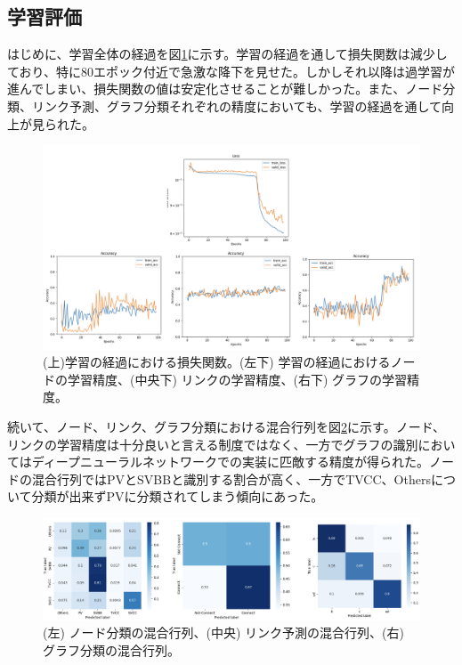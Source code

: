\subsection{学習評価}
はじめに、学習全体の経過を図\ref{gnnoutput}に示す。学習の経過を通して損失関数は減少しており、特に80エポック付近で急激な降下を見せた。しかしそれ以降は過学習が進んでしまい、損失関数の値は安定化させることが難しかった。また、ノード分類、リンク予測、グラフ分類それぞれの精度においても、学習の経過を通して向上が見られた。\\
\begin{figure}[H]
	\begin{center}
 \includegraphics[keepaspectratio, scale=0.3]
 	{Figure/Flavortagging/gnnoutput.png}
 		\caption{(上)学習の経過における損失関数。(左下) 学習の経過におけるノードの学習精度、(中央下) リンクの学習精度、(右下) グラフの学習精度。}
 		\label{gnnoutput}
	\end{center}
\end{figure}
続いて、ノード、リンク、グラフ分類における混合行列を図\ref{gnncm}に示す。ノード、リンクの学習精度は十分良いと言える制度ではなく、一方でグラフの識別においてはディープニューラルネットワークでの実装に匹敵する精度が得られた。ノードの混合行列ではPVとSVBBと識別する割合が高く、一方でTVCC、Othersについて分類が出来ずPVに分類されてしまう傾向にあった。\\
\begin{figure}[H]
	\begin{center}
 \includegraphics[keepaspectratio, scale=0.3]
 	{Figure/Flavortagging/gnncm.png}
 		\caption{(左) ノード分類の混合行列、(中央) リンク予測の混合行列、(右) グラフ分類の混合行列。}
 		\label{gnncm}
	\end{center}
\end{figure}
